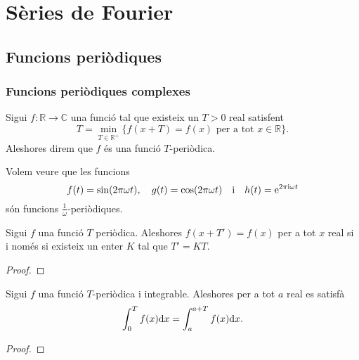 \documentclass[../Apunts.tex]{subfiles}
\begin{document}
\chapter{Sèries de Fourier}
\section{Funcions periòdiques}
	\subsection{Funcions periòdiques complexes}
	\begin{definition}
		\label{def:funció periòdica}
		Sigui \(f\colon\mathbb{R}\longrightarrow\mathbb{C}\) una funció tal que existeix un \(T>0\) real satisfent
		\[T=\min_{T\in\mathbb{R}^{+}}\{f(x+T)=f(x)\text{ per a tot }x\in\mathbb{R}\}.\]
		Aleshores direm que \(f\) és una funció \(T\)-periòdica.
	\end{definition}
	\begin{example}
		\label{ex:periòde del sinus}
		\label{ex:periòde del cosinus}
		\label{ex:periòde de l'exponencial complexa}
		Volem veure que les funcions
		\[f(t)=\sin(2\pi\omega t),\quad g(t)=\cos(2\pi\omega t)\quad\text{i}\quad h(t)=\mathrm{e}^{2\pi\mathrm{i}\omega t}\]
		són funcions \(\frac{1}{\omega}\)-periòdiques.
		\begin{solution}
		\end{solution}
	\end{example}
	\begin{lemma}
		Sigui \(f\) una funció \(T\) periòdica. Aleshores \(f(x+T')=f(x)\) per a tot \(x\) real si i només si existeix un enter \(K\) tal que \(T'=KT\).
		\begin{proof}
		\end{proof}
	\end{lemma}
	\begin{proposition}
		\label{prop:podem desplaçar la integral d'una funció T periòdica}
		Sigui \(f\) una funció \(T\)-periòdica i integrable. Aleshores per a tot \(a\) real es satisfà
		\[\int_{0}^{T}f(x)\mathrm{d} x=\int_{a}^{a+T}f(x)\mathrm{d} x.\]
		\begin{proof}
		\end{proof}
	\end{proposition}
\end{document}
